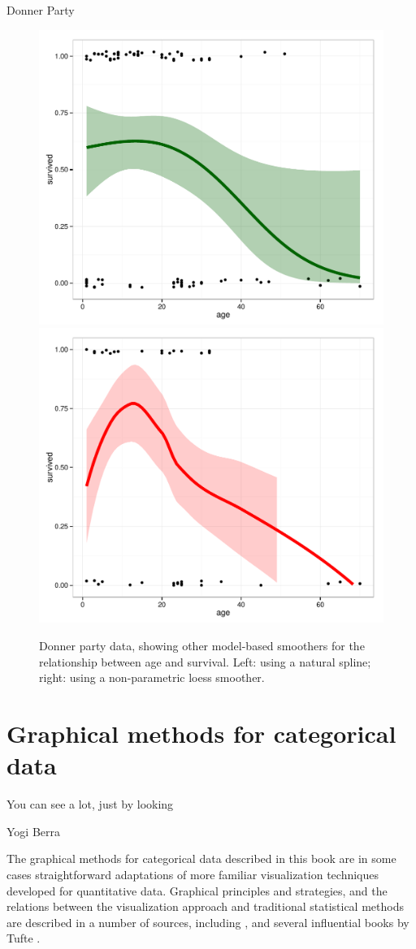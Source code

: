 \documentclass[11pt]{book}
\renewenvironment{knitrout}{\small\renewcommand{\baselinestretch}{.85}}{} %
\begin{document}
\begin{Example}[donner0]{Donner Party}
\begin{knitrout}
\begin{figure}[!htbp]
\centerline{\includegraphics[width=.49\textwidth]{ch01/fig/donner0-other1} 
\includegraphics[width=.49\textwidth]{ch01/fig/donner0-other2} }

\caption[Donner party data, showing other model-based smoothers for the relationship between age and survival]{Donner party data, showing other model-based smoothers for the relationship between age and survival. Left: using a natural spline; right: using a non-parametric loess smoother.\label{fig:donner0-other}}
\end{figure}


\end{knitrout}

\end{Example}

\section{Graphical methods for categorical data}\label{sec:methods}

\epigraph{You can see a lot, just by looking}{Yogi Berra}

The graphical methods for categorical data described in this book
are in some cases straightforward adaptations of more familiar
visualization techniques developed for quantitative data.
Graphical principles and strategies, and the relations between
the visualization approach and traditional statistical methods
are described in a number of sources, including
\citet{Chambers-etal:83},
\citet{Cleveland:VisData} and several influential books by Tufte
\citep{Tufte:83,Tufte:90,Tufte:97,Tufte:2006}.
\end{document}

